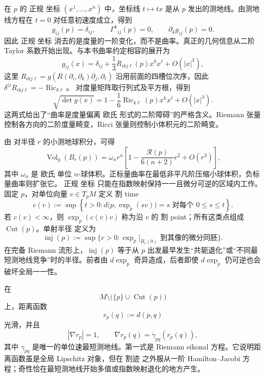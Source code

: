 在 $p$ 的 正规 坐标 $(x^1,\ldots,x^n)$ 中，坐标线 $t\mapsto tx$ 是从 $p$ 发出的测地线。由测地线方程在 $t=0$ 对任意初速度成立，得到
\begin{equation*}g_{ij}(p)=\delta_{ij},
\qquad
\Gamma^k{}_{ij}(p)=0,
\qquad
\partial_k g_{ij}(p)=0.
\end{equation*}
因此 正规 坐标 消去的是度量的一阶变化，而不是曲率。真正的几何信息从二阶 Taylor 系数开始出现。与本书曲率约定相容的展开为
\begin{equation*}g_{ij}(x)
 =\delta_{ij}
 +\frac13 R_{ikj\ell}(p)x^k x^\ell
 +O(|x|^3),
\end{equation*}
这里 $R_{ikj\ell}=g(R(\partial_i,\partial_k)\partial_j,\partial_\ell)$ 沿用前面的四槽位次序，因此 $\delta^{ij}R_{ikj\ell}=-\operatorname{Ric}_{k\ell}$。
对度量矩阵取行列式及平方根，得到
\begin{equation}\label{eq:math-dg-normal-volume-expansion}
 \sqrt{\det g(x)}
 =1-\frac16\operatorname{Ric}_{k\ell}(p)x^k x^\ell
 +O(|x|^3).
\end{equation}
这两式给出了“曲率是度量偏离 欧氏 形式的二阶障碍”的严格含义。Riemann 张量控制各方向的二阶度量畸变，Ricci 张量则控制小体积元的二阶畸变。

由  对半径 $r$ 的小测地球积分，可得
\begin{equation*}\operatorname{Vol}_g(B_r(p))
=\omega_n r^n
\left[
1-\frac{\mathcal R(p)}{6(n+2)}r^2+O(r^3)
\right],
\end{equation*}
其中 $\omega_n$ 是 欧氏 单位 $n$-球体积。正标量曲率在最低非平凡阶压缩小球体积，负标量曲率则扩张它。
正规 坐标 只能在指数映射保持一一且微分可逆的区域内工作。固定 $p$，对单位向量 $v\in T_pM$ 定义 割 time
\begin{equation*}c(v):=\sup\left\{t>0:
 d\bigl(p,\exp_p(sv)\bigr)=s
 \text{ 对每个 }0\le s\le t
 \right\}.
\end{equation*}
若 $c(v)<\infty$，则 $\exp_p(c(v)v)$ 称为沿 $v$ 的 割 point；所有这类点组成 $\operatorname{Cut}(p)$。单射半径 定义为
\begin{equation*}\operatorname{inj}(p):=\sup\{r>0:
 \exp_p|_{B_r(0)}\text{ 到其像的微分同胚}\}.
\end{equation*}
在完备 Riemann 流形上，$\operatorname{inj}(p)$ 等于从 $p$ 出发最早发生“共轭退化”或“不同最短测地线竞争”时的半径。前者由 $d\exp_p$ 奇异造成，后者即使 $d\exp_p$ 仍可逆也会破坏全局一一性。

在
\[
M\setminus\bigl(\{p\}\cup\operatorname{Cut}(p)\bigr)
\]
上，距离函数
\[
r_p(q):=d(p,q)
\]
光滑，并且
\begin{equation*}|\nabla r_p|=1,
\qquad
\nabla r_p(q)=\dot\gamma_{pq}(r_p(q)),
\end{equation*}
其中 $\gamma_{pq}$ 是唯一的单位速最短测地线。第一式是 Riemann eikonal 方程。它说明距离函数虽是全局 Lipschitz 对象，但在 割迹 之外服从一阶 Hamilton--Jacobi 方程；奇性恰在最短测地线开始多值或指数映射退化的地方产生。

